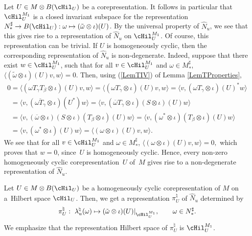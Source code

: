 \begin{rmk}\label{RmkInvSubs}
Let $U \in M \otimes B(\cHil_U)$ be a corepresentation. It follows in particular that $\cHil_U^{M_1}$ is a closed invariant subspace for the  representation $N_\ast^\sharp \rightarrow B(\cHil_U): \omega \mapsto (\tilde{\omega} \otimes \iota)(U)$. By the universal property of $\hat{N}_u$, we see that this gives rise to a representation of $\hat{N}_u$ on $\cHil_U^{M_1}$. Of course, this representation can be trivial. If $U$ is homogeneously cyclic, then the corresponding representation of $\hat{N}_u$ is non-degenerate.  Indeed, suppose that there exist $w \in \cHil_U^{M_1}$, such that for all $v \in \cHil_U^{M_1}$ and $\omega \in M_\ast^\sharp$, $  \langle (\tilde{\omega} \otimes \iota )(U) v, w \rangle =0 $. Then, using (\ref{LemTIV}) of Lemma \ref{LemTProperties},
\begin{gather*}
0 = \langle (\omega  T_\gamma T_\beta \otimes \iota)(U) v, w \rangle =
\langle (\omega T_\gamma  \otimes \iota)(U) v, w \rangle =
\langle  v, (\omega  T_\gamma  \otimes \iota)(U)^\ast w \rangle  \\
\phantom{0}{} =  \langle  v, (\overline{\omega  T_\gamma}  \otimes \iota)(U^\ast) w \rangle =
\langle  v, (\overline{\omega}  T_\gamma  \otimes \iota)(S \otimes \iota)(U) w \rangle  \\
\phantom{0}{} =  \langle  v, (\overline{\omega} \otimes \iota) (S \otimes \iota) (T_\beta \otimes \iota)(U) w \rangle =
 \langle  v, (\omega^\ast  \otimes \iota)(T_\beta \otimes \iota)(U) w\rangle  \\
\phantom{0}{} =  \langle  v, (\omega^\ast  \otimes \iota)(U) w \rangle =
\langle (\omega  \otimes \iota)(U)  v,  w \rangle.
\end{gather*}
We see that for all $v \in \cHil_U^{M_1}$ and $\omega \in M_\ast^\sharp$,
$  \langle (\omega \otimes \iota )(U) v, w \rangle =0,$
which proves that $w = 0$, since~$U$ is homogeneously cyclic. Hence, every non-zero homogeneously cyclic corepresentation~$U$ of~$M$ gives rise to a  non-degenerate representation of $\hat{N}_u$.
\end{rmk}

\begin{dfn}\label{DfnRep}
Let $U \in M \otimes B(\cHil_U)$ be a homogeneously cyclic corepresentation of $M$ on a~Hilbert space $\cHil_U$. Then, we get a representation $\pi_U^\natural$ of $\hat{N}_u$ determined by
\[
\pi_U^\natural: \ \lambda_u^\natural(\omega) \mapsto (\tilde{\omega} \otimes \iota)(U) \vert_{\cHil_{U}^{M_1}}, \qquad \omega \in N_\ast^\sharp.
\]
 We emphasize that the representation Hilbert space of $\pi_U^\natural$ is $\cHil_U^{M_1}$.
\end{dfn}

